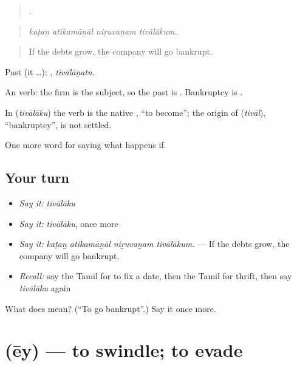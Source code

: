 \begin{quote}
   .
\end{quote}

\begin{quote}
\emph{kaṭaṉ atikamāṉāl niṟuvaṉam tivālākum.}
\end{quote}

\begin{quote}
If the debts grow, the company will go bankrupt.
\end{quote}

Past (it …): , \emph{tivālāṉatu}.

An  verb: the firm is the subject, so the past is . Bankruptcy is .

\begin{cousinweb}
In \textbf{} (\emph{tivālāku}) the verb is the native , \textquotedblleft{}to become\textquotedblright{}; the origin of  (\emph{tivāl}), \textquotedblleft{}bankruptcy\textquotedblright{}, is not settled.
\end{cousinweb}

\begin{grammarlens}[title={What you've built}]
One more word for saying what happens if.
\end{grammarlens}

\subsection*{Your turn}
\begin{itemize}
\raggedright
  \item \emph{Say it:} \emph{tivālāku}
  \item \emph{Say it:} \emph{tivālāku}, once more
  \item \emph{Say it:} \emph{kaṭaṉ atikamāṉāl niṟuvaṉam tivālākum.} — If the debts grow, the company will go bankrupt.
  \item \emph{Recall:} say the Tamil for to fix a date, then the Tamil for thrift, then say \emph{tivālāku} again
\end{itemize}

\begin{tcolorbox}[breakable,colback=teal!4,colframe=teal!35!black,title={Before you move on}]
What does  mean? (\textquotedblleft{}To go bankrupt\textquotedblright{}.) Say it once more.
\end{tcolorbox}
\section[\texorpdfstring{\ta{ஏய்} (ēy)}{ஏய் (ēy)}]{ (ēy) — to swindle; to evade}

